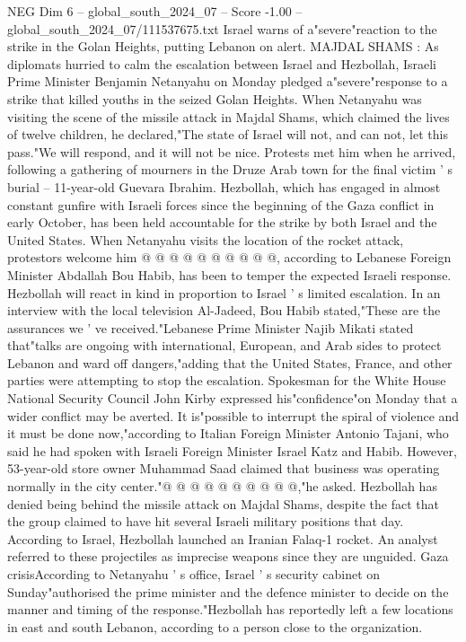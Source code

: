 \begin{textsample}{NEG Dim 6 – global\_south\_2024\_07 – Score -1.00 – global\_south\_2024\_07/111537675.txt}  \label{ex:f6_neg_131}
Israel warns of a"severe"reaction to the strike in the Golan Heights, putting Lebanon on alert.
MAJDAL SHAMS : As diplomats hurried to calm the escalation between Israel and Hezbollah, Israeli Prime Minister Benjamin Netanyahu on Monday pledged a"severe"response to a strike that killed youths in the seized Golan Heights.
When Netanyahu was visiting the scene of the missile attack in Majdal Shams, which claimed the lives of twelve children, he declared,"The state of Israel will not, and can not, let this pass."We will respond, and it will not be nice.
Protests met him when he arrived, following a gathering of mourners in the Druze Arab town for the final victim ' s burial -- 11-year-old Guevara Ibrahim.
Hezbollah, which has engaged in almost constant gunfire with Israeli forces since the beginning of the Gaza conflict in early October, has been held accountable for the strike by both Israel and the United States.
When Netanyahu visits the location of the rocket attack, protestors welcome him @ @ @ @ @ @ @ @ @ @, according to Lebanese Foreign Minister Abdallah Bou Habib, has been to temper the expected Israeli response.
Hezbollah will react in kind in proportion to Israel ' s limited escalation.
In an interview with the local television Al-Jadeed, Bou Habib stated,"These are the assurances we ' ve received."Lebanese Prime Minister Najib Mikati stated that"talks are ongoing with international, European, and Arab sides to protect Lebanon and ward off dangers,"adding that the United States, France, and other parties were attempting to stop the escalation.
Spokesman for the White House National Security Council John Kirby expressed his"confidence"on Monday that a wider conflict may be averted.
It is"possible to interrupt the spiral of violence and it must be done now,"according to Italian Foreign Minister Antonio Tajani, who said he had spoken with Israeli Foreign Minister Israel Katz and Habib.
However, 53-year-old store owner Muhammad Saad claimed that business was operating normally in the city center."@ @ @ @ @ @ @ @ @ @,"he asked.
Hezbollah has denied being behind the missile attack on Majdal Shams, despite the fact that the group claimed to have hit several Israeli military positions that day.
According to Israel, Hezbollah launched an Iranian Falaq-1 rocket.
An analyst referred to these projectiles as imprecise weapons since they are unguided.
Gaza crisisAccording to Netanyahu ' s office, Israel ' s security cabinet on Sunday"authorised the prime minister and the defence minister to decide on the manner and timing of the response."Hezbollah has reportedly left a few locations in east and south Lebanon, according to a person close to the organization.

\end{textsample}
